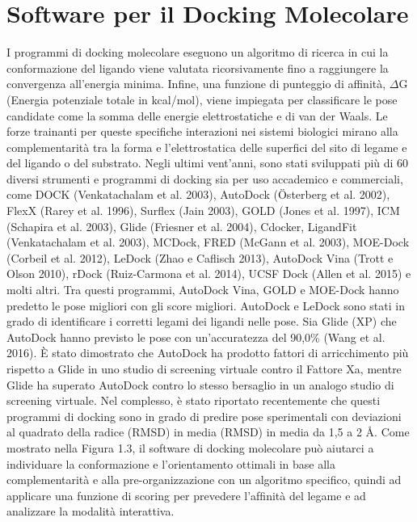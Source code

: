 \section{Software per il Docking Molecolare}
I programmi di docking molecolare eseguono un algoritmo di ricerca in cui la conformazione del ligando viene valutata ricorsivamente fino a raggiungere la convergenza all'energia minima. Infine, una funzione di punteggio di affinità, $\Delta$G (Energia potenziale totale in kcal/mol), viene impiegata per classificare le pose candidate come la somma delle energie elettrostatiche e di van der Waals. Le forze trainanti per queste specifiche interazioni nei sistemi biologici mirano alla complementarità tra la forma e l'elettrostatica delle superfici del sito di legame e del ligando o del substrato. \newline
Negli ultimi vent'anni, sono stati sviluppati più di 60 diversi strumenti e programmi di docking sia per uso accademico e commerciali, come DOCK (Venkatachalam et al. 2003), AutoDock (Österberg et al. 2002), FlexX (Rarey et al. 1996), Surflex (Jain 2003), GOLD (Jones et al. 1997), ICM (Schapira et al. 2003), Glide (Friesner et al. 2004), Cdocker, LigandFit (Venkatachalam et al. 2003), MCDock, FRED (McGann et al. 2003), MOE-Dock (Corbeil et al. 2012), LeDock (Zhao e Caflisch 2013), AutoDock Vina (Trott e Olson 2010), rDock (Ruiz-Carmona et al. 2014), UCSF Dock (Allen et al. 2015) e molti altri. \newline 
Tra questi programmi, AutoDock Vina, GOLD e MOE-Dock hanno predetto le pose migliori con gli score migliori. AutoDock e LeDock sono stati in grado di identificare i corretti legami dei ligandi nelle pose. Sia Glide (XP) che AutoDock hanno previsto le pose con un'accuratezza del 90,0\% (Wang et al. 2016). È stato dimostrato che AutoDock ha prodotto fattori di arricchimento più rispetto a Glide in uno studio di screening virtuale contro il Fattore Xa, mentre Glide ha superato AutoDock contro lo stesso bersaglio in un analogo studio di screening virtuale. Nel complesso, è stato riportato recentemente che questi programmi di docking sono in grado di predire pose sperimentali con deviazioni al quadrato della radice (RMSD) in media (RMSD) in media da 1,5 a 2 Å\cite{pagadala2017software}.\newline 
Come mostrato nella Figura 1.3, il software di docking molecolare può aiutarci a individuare la conformazione e l'orientamento ottimali in base alla complementarità e alla pre-organizzazione con un algoritmo specifico, quindi ad applicare una funzione di scoring per prevedere l'afﬁnità del legame e ad analizzare la modalità interattiva\cite{fan2019progress}.

